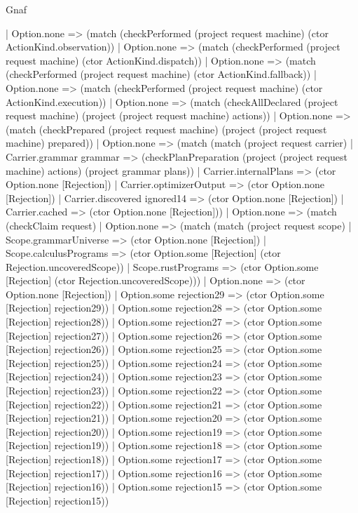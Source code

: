 \begin{lexlean}{Gnaf}
\begin{semanticmodule}
{              | Option.none => (match (checkPerformed (project request machine) (ctor ActionKind.observation))
                | Option.none => (match (checkPerformed (project request machine) (ctor ActionKind.dispatch))
                  | Option.none => (match (checkPerformed (project request machine) (ctor ActionKind.fallback))
                    | Option.none => (match (checkPerformed (project request machine) (ctor ActionKind.execution))
                      | Option.none => (match (checkAllDeclared (project request machine) (project (project request machine) actions))
                        | Option.none => (match (checkPrepared (project request machine) (project (project request machine) prepared))
                          | Option.none => (match (match (project request carrier)
                              | Carrier.grammar grammar => (checkPlanPreparation (project (project request machine) actions) (project grammar plans))
                              | Carrier.internalPlans => (ctor Option.none [Rejection])
                              | Carrier.optimizerOutput => (ctor Option.none [Rejection])
                              | Carrier.discovered ignored14 => (ctor Option.none [Rejection])
                              | Carrier.cached => (ctor Option.none [Rejection]))
                            | Option.none => (match (checkClaim request)
                              | Option.none => (match (match (project request scope)
                                  | Scope.grammarUniverse => (ctor Option.none [Rejection])
                                  | Scope.calculusPrograms => (ctor Option.some [Rejection] (ctor Rejection.uncoveredScope))
                                  | Scope.rustPrograms => (ctor Option.some [Rejection] (ctor Rejection.uncoveredScope)))
                                | Option.none => (ctor Option.none [Rejection])
                                | Option.some rejection29 => (ctor Option.some [Rejection] rejection29))
                              | Option.some rejection28 => (ctor Option.some [Rejection] rejection28))
                            | Option.some rejection27 => (ctor Option.some [Rejection] rejection27))
                          | Option.some rejection26 => (ctor Option.some [Rejection] rejection26))
                        | Option.some rejection25 => (ctor Option.some [Rejection] rejection25))
                      | Option.some rejection24 => (ctor Option.some [Rejection] rejection24))
                    | Option.some rejection23 => (ctor Option.some [Rejection] rejection23))
                  | Option.some rejection22 => (ctor Option.some [Rejection] rejection22))
                | Option.some rejection21 => (ctor Option.some [Rejection] rejection21))
              | Option.some rejection20 => (ctor Option.some [Rejection] rejection20))
            | Option.some rejection19 => (ctor Option.some [Rejection] rejection19))
          | Option.some rejection18 => (ctor Option.some [Rejection] rejection18))
        | Option.some rejection17 => (ctor Option.some [Rejection] rejection17))
      | Option.some rejection16 => (ctor Option.some [Rejection] rejection16))
    | Option.some rejection15 => (ctor Option.some [Rejection] rejection15))
}


\end{semanticmodule}
\end{lexlean}

